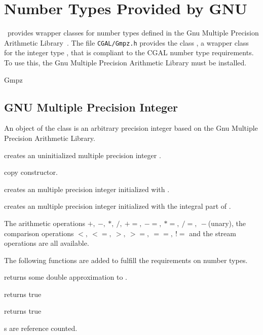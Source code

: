 \section{Number Types Provided by GNU}

\cgal\ provides wrapper classes for number types defined in the 
{\sc Gnu} Multiple Precision Arithmetic Library~\cite{g-gmpal-96}.
The file {\tt  CGAL/Gmpz.h} provides the class , 
a wrapper class for the integer type , that is compliant to the 
CGAL number type requirements.
To use this, the {\sc Gnu} Multiple Precision Arithmetic Library must be 
installed.

\begin{ccClass} {Gmpz}
\label{Gmpz}
\subsection{GNU Multiple Precision Integer}

\ccDefinition

An object of the class  is an arbitrary precision integer 
based on the {\sc Gnu} Multiple Precision Arithmetic Library. 


\ccCreation
{}

             {creates an uninitialized multiple precision integer \ccVar.}

\ccHidden {}
 	    {copy constructor.}

            {creates an multiple precision integer initialized with
             .}

            {creates an multiple precision integer initialized with
             the integral part of .}

\ccOperations

The arithmetic operations $+,\ -,\ *,\ /,\ +=,\ -=,\ *=,\ /=,\ -$(unary),
the comparison operations $<,\ <=,\ >,\  >=,\ ==,\ !=$ and the stream 
operations are all available.


The following functions are added to fulfill the {\cgal} requirements
on number types.

       {returns some double approximation to .}

       {returns true}

       {returns true}

       {}

\ccImplementation
{}s are reference counted.
\end{ccClass} 

